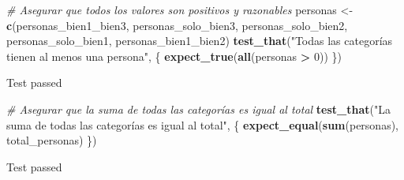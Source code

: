 \documentclass[
]{article}
\newenvironment{Shaded}{\begin{snugshade}}{\end{snugshade}}
\newcommand{\CommentTok}[1]{\textcolor[rgb]{0.56,0.35,0.01}{\textit{#1}}}
\newcommand{\DecValTok}[1]{\textcolor[rgb]{0.00,0.00,0.81}{#1}}
\newcommand{\FunctionTok}[1]{\textcolor[rgb]{0.13,0.29,0.53}{\textbf{#1}}}
\newcommand{\NormalTok}[1]{#1}
\newcommand{\OtherTok}[1]{\textcolor[rgb]{0.56,0.35,0.01}{#1}}
\newcommand{\SpecialCharTok}[1]{\textcolor[rgb]{0.81,0.36,0.00}{\textbf{#1}}}
\newcommand{\StringTok}[1]{\textcolor[rgb]{0.31,0.60,0.02}{#1}}
\begin{document}
\begin{Shaded}
\begin{Highlighting}[]
\CommentTok{\# Asegurar que todos los valores son positivos y razonables}
\NormalTok{personas }\OtherTok{\textless{}{-}} \FunctionTok{c}\NormalTok{(personas\_bien1\_bien3, personas\_solo\_bien3, personas\_solo\_bien2, personas\_solo\_bien1, personas\_bien1\_bien2)}
\FunctionTok{test\_that}\NormalTok{(}\StringTok{"Todas las categorías tienen al menos una persona"}\NormalTok{, \{}
  \FunctionTok{expect\_true}\NormalTok{(}\FunctionTok{all}\NormalTok{(personas }\SpecialCharTok{\textgreater{}} \DecValTok{0}\NormalTok{))}
\NormalTok{\})}
\end{Highlighting}
\end{Shaded}

Test passed

\begin{Shaded}
\begin{Highlighting}[]
\CommentTok{\# Asegurar que la suma de todas las categorías es igual al total}
\FunctionTok{test\_that}\NormalTok{(}\StringTok{"La suma de todas las categorías es igual al total"}\NormalTok{, \{}
  \FunctionTok{expect\_equal}\NormalTok{(}\FunctionTok{sum}\NormalTok{(personas), total\_personas)}
\NormalTok{\})}
\end{Highlighting}
\end{Shaded}

Test passed
\end{document}
